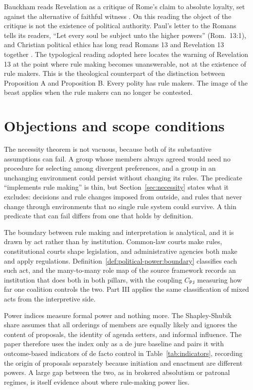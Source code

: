 \documentclass[11pt,letterpaper]{article}
\theoremstyle{definition}
\theoremstyle{remark}
\newcommand{\pP}{\mathsf{P}}
\newcommand{\pJ}{\mathsf{J}}
\begin{document}
Bauckham reads Revelation as a critique of Rome's claim to absolute loyalty, set against the alternative of faithful witness \citep{bauckham1993}. On this reading the object of the critique is not the existence of political authority. Paul's letter to the Romans tells its readers, ``Let every soul be subject unto the higher powers'' (Rom.\ 13:1), and Christian political ethics has long read Romans 13 and Revelation 13 together \citep{yoder1972}. The typological reading adopted here locates the warning of Revelation 13 at the point where rule making becomes unanswerable, not at the existence of rule makers. This is the theological counterpart of the distinction between Proposition A and Proposition B. Every polity has rule makers. The image of the beast applies when the rule makers can no longer be contested.

\section{Objections and scope conditions}
\label{sec:objections}

The necessity theorem is not vacuous, because both of its substantive assumptions can fail. A group whose members always agreed would need no procedure for selecting among divergent preferences, and a group in an unchanging environment could persist without changing its rules. The predicate ``implements rule making'' is thin, but Section~\ref{sec:necessity} states what it excludes: decisions and rule changes imposed from outside, and rules that never change through environments that no single rule system could survive. A thin predicate that can fail differs from one that holds by definition.

The boundary between rule making and interpretation is analytical, and it is drawn by act rather than by institution. Common-law courts make rules, constitutional courts shape legislation, and administrative agencies both make and apply regulations. Definition~\ref{def:political-power:boundary} classifies each such act, and the many-to-many role map of the source framework records an institution that does both in both pillars, with the coupling $C_{\pP\pJ}$ measuring how far one coalition controls the two. Part III applies the same classification of mixed acts from the interpretive side.

Power indices measure formal power and nothing more. The Shapley-Shubik share assumes that all orderings of members are equally likely and ignores the content of proposals, the identity of agenda setters, and informal influence. The paper therefore uses the index only as a de jure baseline and pairs it with outcome-based indicators of de facto control in Table~\ref{tab:indicators}, recording the origin of proposals separately because initiation and enactment are different powers. A large gap between the two, as in brokered absolutism or patronal regimes, is itself evidence about where rule-making power lies.
\end{document}
